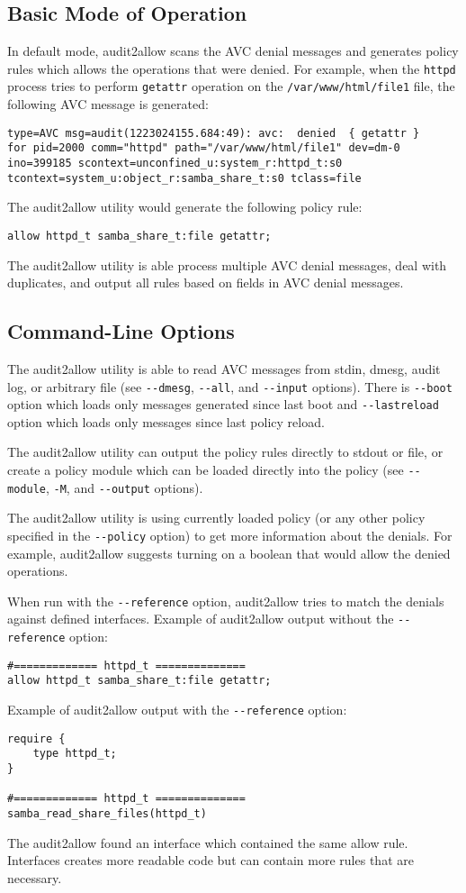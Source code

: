 \subsection{Basic Mode of Operation}
In default mode, audit2allow scans the AVC denial messages and generates policy
rules which allows the operations that were denied. For example, when the
\texttt{httpd} process tries to perform \texttt{getattr} operation on the
\texttt{/var/www/html/file1} file, the following AVC message is generated:
\begin{lstlisting}
type=AVC msg=audit(1223024155.684:49): avc:  denied  { getattr }
for pid=2000 comm="httpd" path="/var/www/html/file1" dev=dm-0
ino=399185 scontext=unconfined_u:system_r:httpd_t:s0
tcontext=system_u:object_r:samba_share_t:s0 tclass=file
\end{lstlisting}
The audit2allow utility would generate the following policy rule:
\begin{lstlisting}
allow httpd_t samba_share_t:file getattr;
\end{lstlisting}
The audit2allow utility is able process multiple AVC denial messages, deal with
duplicates, and output all rules based on fields in AVC denial messages.

\subsection{Command-Line Options}
The audit2allow utility is able to read AVC messages from stdin, dmesg, audit
log, or arbitrary file (see \texttt{-{}-dmesg}, \texttt{-{}-all}, and
\texttt{-{}-input} options). There is \texttt{-{}-boot} option which loads only
messages generated since last boot and \texttt{-{}-lastreload} option which
loads only messages since last policy reload.

The audit2allow utility can output the policy rules directly to stdout or file,
or create a policy module which can be loaded directly into the policy (see
\texttt{-{}-module}, \texttt{-M}, and \texttt{-{}-output} options).

The audit2allow utility is using currently loaded policy (or any other policy
specified in the \texttt{-{}-policy} option) to get more information about the
denials.  For example, audit2allow suggests turning on a boolean that would
allow the denied operations.

When run with the \texttt{-{}-reference} option, audit2allow tries to match the
denials against defined interfaces. Example of audit2allow output without the
\texttt{-{}-reference} option:
\begin{lstlisting}
#============= httpd_t ==============
allow httpd_t samba_share_t:file getattr;
\end{lstlisting}
Example of audit2allow output with the \texttt{-{}-reference} option:
\begin{lstlisting}
require {
	type httpd_t;
}

#============= httpd_t ==============
samba_read_share_files(httpd_t)
\end{lstlisting}
The audit2allow found an interface which contained the same allow
rule. Interfaces creates more readable code but can contain more rules that are
necessary.

